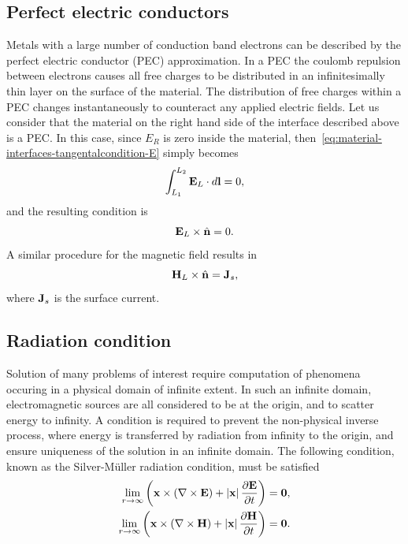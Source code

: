 \subsection{Perfect electric conductors}
Metals with a large number of conduction band electrons can be described by the
perfect electric conductor (PEC) approximation. In a PEC the coulomb repulsion
between electrons causes all free charges to be distributed in an
infinitesimally thin layer on the surface of the material. The distribution of
free charges within a PEC changes instantaneously to counteract any applied
electric fields. Let us consider that the material on the right hand side of the
interface described above is a PEC. In this case, since $E_R$ is zero inside the
material, then~\eqref{eq:material-interfaces-tangentalcondition-E} simply
becomes
$$
\int_{L_1}^{L_2} \mathbf{E}_L \cdot d\mathbf{l} = 0 ,
$$
and the resulting condition is
$$
\mathbf{E}_L \times \hat{\mathbf{n}} = 0 .
$$
A similar procedure for the magnetic field results in
$$
\mathbf{H}_L \times \hat{\mathbf{n}} = \mathbf{J}_s ,
$$
where $\mathbf{J}_s$ is the surface current.

\subsection{Radiation condition}
Solution of many problems of interest require computation of phenomena occuring
in a physical domain of infinite extent. In such an infinite domain, electromagnetic
sources are all considered to be at the origin, and to scatter energy to infinity.
A condition is required to prevent the non-physical inverse process, where energy
is transferred by radiation from infinity to the origin, and ensure uniqueness of
the solution in an infinite domain. The following condition,
known as the Silver-M\"uller radiation condition, must be satisfied
\begin{align}
  \lim_{ r \to \infty } \left( \mathbf{x} \times \left( \nabla \times \mathbf{E} \right) + \left| \mathbf{x} \right| \frac{\partial \mathbf{E}}{\partial t} \right) = \mathbf{0}, \\
  \lim_{ r \to \infty } \left( \mathbf{x} \times \left( \nabla \times \mathbf{H} \right) + \left| \mathbf{x} \right| \frac{\partial \mathbf{H}}{\partial t} \right) = \mathbf{0}.
\end{align}

